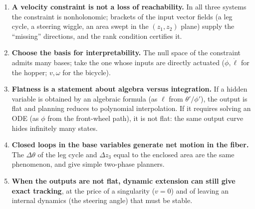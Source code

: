 \documentclass[11pt,a4paper]{article}
\theoremstyle{definition}
\theoremstyle{plain}
\theoremstyle{remark}
\begin{document}
\begin{enumerate}
  \item \textbf{A velocity constraint is not a loss of reachability.} In all three systems the constraint is nonholonomic; brackets of the input vector fields (a leg cycle, a steering wiggle, an area swept in the $(z_1,z_2)$ plane) supply the ``missing'' directions, and the rank condition certifies it.
  \item \textbf{Choose the basis for interpretability.} The null space of the constraint admits many bases; take the one whose inputs are directly actuated ($\dot\phi,\dot\ell$ for the hopper; $v,\omega$ for the bicycle).
  \item \textbf{Flatness is a statement about algebra versus integration.} If a hidden variable is obtained by an algebraic formula (as $\ell$ from $\theta'/\phi'$), the output is flat and planning reduces to polynomial interpolation. If it requires solving an ODE (as $\phi$ from the front-wheel path), it is not flat: the same output curve hides infinitely many states.
  \item \textbf{Closed loops in the base variables generate net motion in the fiber.} The $\Delta\theta$ of the leg cycle and $\Delta z_3$ equal to the enclosed area are the same phenomenon, and give simple two-phase planners.
  \item \textbf{When the outputs are not flat, dynamic extension can still give exact tracking}, at the price of a singularity ($v=0$) and of leaving an internal dynamics (the steering angle) that must be stable.
\end{enumerate}
\end{document}
